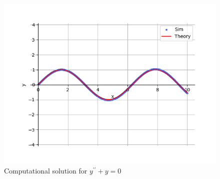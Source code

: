 \documentclass[journal]{IEEEtran}
\begin{document}
\begin{figure}[h!]
    \centering
    \includegraphics[width=0.7\columnwidth]{figs/graph.png}
    \caption{Computational solution for $y^{\prime\prime} + y = 0$}
    \label{label}
\end{figure}
\end{document}
